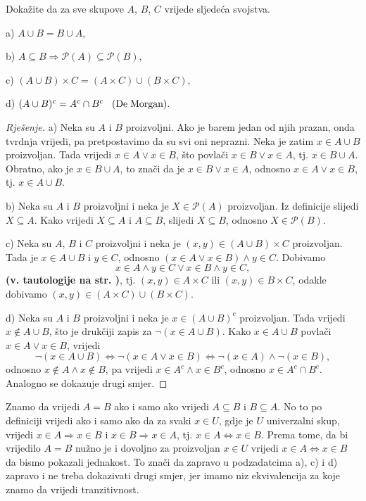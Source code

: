 \begin{exercise}
Dokažite da za sve skupove $A$, $B$, $C$ vrijede sljedeća svojstva.
\begin{AutoMultiColItemize}
\item[a)] $A\cup B=B\cup A,$
\item[b)] $A\subseteq B\Rightarrow \mathcal{P}(A)\subseteq \mathcal{P}(B),$
\item[c)] $(A\cup B)\times C=(A\times C)\cup (B\times C),$
\item[d)] $(A\cup B)^c=A^c\cap B^c \hspace{0.3cm} \mathrm{(De} \hspace{0.1cm}\mathrm{Morgan)}.$
\end{AutoMultiColItemize}
\begin{proof}[Rješenje]
a) Neka su $A$ i $B$ proizvoljni. Ako je barem jedan od njih prazan, onda tvrdnja vrijedi, pa pretpostavimo da su svi oni neprazni. Neka je zatim $x\in A\cup B$ proizvoljan. Tada vrijedi $x\in A\vee x\in B$, što povlači $x\in B\vee x\in A$, tj. $x\in B\cup A$. Obratno, ako je $x\in B\cup A$, to znači da je $x\in B\vee x\in A$, odnosno $x\in A\vee x\in B$, tj. $x\in A\cup B$.

b) Neka su $A$ i $B$ proizvoljni i neka je $X\in \mathcal{P}(A)$ proizvoljan. Iz definicije slijedi $X\subseteq A$. Kako vrijedi $X\subseteq A$ i $A\subseteq B$, slijedi $X\subseteq B$, odnosno $X\in \mathcal{P}(B)$.

c) Neka su $A$, $B$ i $C$ proizvoljni i neka je $(x, y)\in (A\cup B)\times C$ proizvoljan. Tada je $x\in A\cup B$ i $y\in C$, odnosno $(x\in A\vee x\in B)\wedge y\in C$. Dobivamo $$x\in A\wedge y\in C\vee x\in B\wedge y\in C,$$
\textbf{(v. tautologije na str. )}, tj. $(x, y)\in A\times C$ ili $(x, y)\in B\times C$, odakle dobivamo $(x, y)\in (A\times C)\cup (B\times C)$.

d) Neka su $A$ i $B$ proizvoljni i neka je $x\in (A\cup B)^c$ proizvoljan. Tada vrijedi $x\notin A\cup B$, što je drukčiji zapis za $\neg(x\in A\cup B)$. Kako $x\in A\cup B$ povlači $x\in A \vee x\in B$, vrijedi $$\neg(x\in A\cup B)\Leftrightarrow\neg(x\in A \vee x\in B)\Leftrightarrow\neg (x\in A)\wedge \neg (x\in B),$$ odnosno $x\notin A \wedge x\notin B$, pa vrijedi $x\in A^c\wedge x\in B^c$, odnosno $x\in A^c\cap B^c$. Analogno se dokazuje drugi smjer.
\end{proof}
\end{exercise}
\begin{remark}
\label{firstrem}
Znamo da vrijedi $A=B$ ako i samo ako vrijedi $A\subseteq B$ i $B\subseteq A$. No to po definiciji vrijedi ako i samo ako da za svaki $x\in U$, gdje je $U$ univerzalni skup, vrijedi $x\in A\Rightarrow x\in B$ i $x\in B\Rightarrow x\in A$, tj. $x\in A\Leftrightarrow x\in B$. Prema tome, da bi vrijedilo $A=B$ nužno je i dovoljno za proizvoljan $x\in U$ vrijedi $x\in A\Leftrightarrow x\in B$ da bismo pokazali jednakost. To znači da zapravo u podzadatcima a), c) i d) zapravo i ne treba dokazivati drugi smjer, jer imamo niz ekvivalencija za koje znamo da vrijedi tranzitivnost.
\end{remark}

